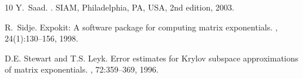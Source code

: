\documentclass[smallextended]{svjour3pre}%
\numberwithin{equation}{section}
\numberwithin{figure}{section}
\numberwithin{table}{section}
\begin{document}
\begin{thebibliography}{10}
Y.~Saad.
.
\newblock SIAM, Philadelphia, PA, USA, 2nd edition, 2003.

R.~Sidje.
\newblock Expokit: A software package for computing matrix exponentials.
, 24(1):130--156, 1998.

D.E. Stewart and T.S. Leyk.
\newblock Error estimates for {K}rylov subspace approximations of matrix
  exponentials.
, 72:359--369, 1996.

\end{thebibliography}
\end{document}
